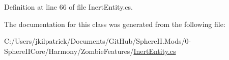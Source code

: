 Definition at line 66 of file Inert\+Entity.\+cs.



The documentation for this class was generated from the following file\+:\begin{DoxyCompactItemize}
\item 
C\+:/\+Users/jkilpatrick/\+Documents/\+Git\+Hub/\+Sphere\+I\+I.\+Mods/0-\/\+Sphere\+I\+I\+Core/\+Harmony/\+Zombie\+Features/\mbox{\hyperlink{_inert_entity_8cs}{Inert\+Entity.\+cs}}\end{DoxyCompactItemize}
